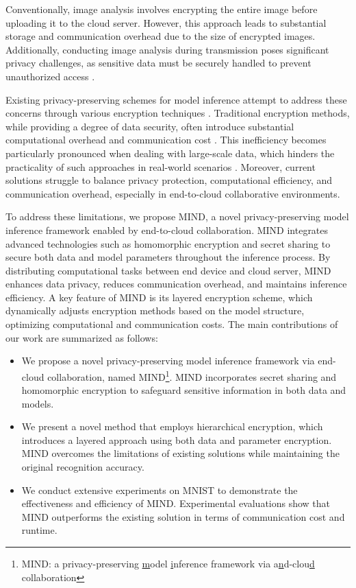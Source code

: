 \documentclass[conference]{IEEEtran}
\begin{document}
Conventionally, image analysis involves encrypting the entire image before uploading it to the cloud server. However, this approach leads to substantial storage and communication overhead due to the size of encrypted images. Additionally, conducting image analysis during transmission poses significant privacy challenges, as sensitive data must be securely handled to prevent unauthorized access \cite{van2014datafication}.

Existing privacy-preserving schemes for model inference attempt to address these concerns through various encryption techniques \cite{fu2020vfl, yang2012efficient}. Traditional encryption methods, while providing a degree of data security, often introduce substantial computational overhead and communication cost \cite{kerschbaum2012outsourced}. This inefficiency becomes particularly pronounced when dealing with large-scale data, which hinders the practicality of such approaches in real-world scenarios \cite{li2015encdb}. Moreover, current solutions struggle to balance privacy protection, computational efficiency, and communication overhead, especially in end-to-cloud collaborative environments.

To address these limitations, we propose MIND, a novel privacy-preserving model inference framework enabled by end-to-cloud collaboration. MIND integrates advanced technologies such as homomorphic encryption and secret sharing to secure both data and model parameters throughout the inference process. By distributing computational tasks between end device and cloud server, MIND enhances data privacy, reduces communication overhead, and maintains inference efficiency. A key feature of MIND is its layered encryption scheme, which dynamically adjusts encryption methods based on the model structure, optimizing computational and communication costs. The main contributions of our work are summarized as follows:

\begin{itemize}
    \item We propose a novel privacy-preserving model inference framework via end-cloud collaboration, named MIND\footnote{MIND: a privacy-preserving \underline{m}odel \underline{i}nference framework via a\underline{n}d-clou\underline{d} collaboration}. MIND incorporates secret sharing and homomorphic encryption to safeguard sensitive information in both data and models. 
    
    \item We present a novel method that employs hierarchical encryption, which introduces a layered approach using both data and parameter encryption. MIND overcomes the limitations of existing solutions while maintaining the original recognition accuracy.
    
    \item We conduct extensive experiments on MNIST to demonstrate the effectiveness and efficiency of MIND. Experimental evaluations show that MIND outperforms the existing solution in terms of communication cost and runtime.  
\end{itemize}
\end{document}
